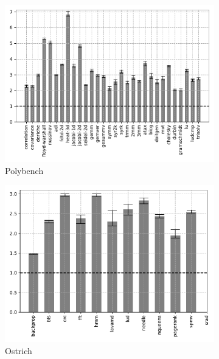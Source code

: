\begin{figure}
    \centering
    \begin{subfigure}[t]{\textwidth}
        \includegraphics[width=\textwidth]
        {Images/6.1.RQ1/polybench-wasmer-cranelift-naive.pdf}
        \caption{Polybench}
    \end{subfigure}
    \begin{subfigure}[t]{.45\textwidth}
        \includegraphics[width=\textwidth]
        {Images/6.1.RQ1/ostrich-wasmer-cranelift-naive.pdf}
        \caption{Ostrich}
    \end{subfigure}
    \begin{subfigure}[t]{.45\textwidth}

\end{subfigure}
\end{figure}
